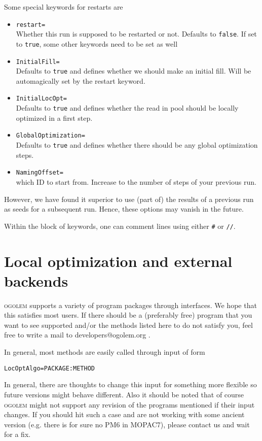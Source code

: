 \documentclass[a4paper,10pt]{scrbook}
\newcommand{\ogo}{\textsc{ogolem}}
\begin{document}
Some special keywords for restarts are
\begin{itemize}
  \item \texttt{restart=}\\
      Whether this run is supposed to be restarted or not. Defaults to
\texttt{false}. If set to \texttt{true}, some other keywords need to be set as
well
  \item \texttt{InitialFill=}\\
      Defaults to \texttt{true} and defines whether we should make an initial
fill. Will be automagically set by the restart keyword.
  \item \texttt{InitialLocOpt=}\\
      Defaults to \texttt{true} and defines whether the read in pool should be
locally optimized in a first step.
  \item \texttt{GlobalOptimization=}\\
      Defaults to \texttt{true} and defines whether there should be any global
optimization steps.
  \item \texttt{NamingOffset=}\\
      which ID to start from. Increase to the number of steps of your previous
run.
\end{itemize}
However, we have found it superior to use (part of) the results of a previous
run as seeds for a subsequent run. Hence, these options may vanish in the
future.

Within the block of keywords, one can comment lines using either \texttt{\#} or
\texttt{//}.

\section{Local optimization and external backends}
\ogo{} supports a variety of program packages through interfaces. We hope that
this satisfies most users. If there should be a (preferably free) program that
you want to see supported and/or the methods listed here to do not satisfy you,
feel free to write a mail to developers@ogolem.org .

In general, most methods are easily called through input of form
\begin{verbatim}
LocOptAlgo=PACKAGE:METHOD
\end{verbatim}


In general, there are thoughts to change this input for something more flexible
so future versions might behave different. Also it should be noted that of
course \ogo{} might not support any revision of the programs mentioned if their
input changes. If you should hit such a case and are not working with some
ancient version (e.g. there is for sure no PM6 in MOPAC7), please contact us
and wait for a fix.
\end{document}
